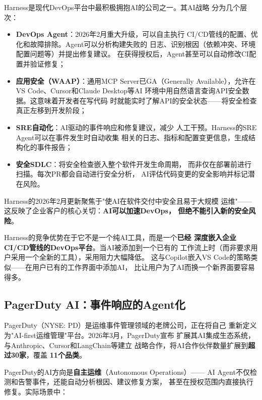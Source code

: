 Harness是现代DevOps平台中最积极拥抱AI的公司之一。其AI战略
分为几个层次：

\begin{itemize}
  \item \textbf{DevOps Agent}：2026年2月重大升级，可以自主执行
    CI/CD管线的配置、优化和故障排除。Agent可以分析构建失败的
    日志、识别根因（依赖冲突、环境配置问题等）并提出修复建议。
    在获得授权后，Agent甚至可以自动修改CI配置并验证修复；
  \item \textbf{应用安全（WAAP）}：通用MCP Server已GA（Generally
    Available），允许在VS Code、Cursor和Claude Desktop等AI
    环境中用自然语言查询API安全数据。这意味着开发者在写代码
    时就能实时了解API的安全状态——将安全检查真正左移到开发阶段；
  \item \textbf{SRE自动化}：AI驱动的事件响应和修复建议，减少
    人工干预。Harness的SRE Agent可以在事件发生时自动收集
    相关的日志、指标和配置变更信息，生成结构化的事件报告；
  \item \textbf{安全SDLC}：将安全检查嵌入整个软件开发生命周期，
    而非仅在部署前进行扫描。每次PR都会自动进行安全分析，
    AI评估代码变更的安全影响并标记潜在风险。
\end{itemize}

Harness的2026年2月更新聚焦于"使AI在软件交付中安全且易于大规模
运维"——这反映了企业客户的核心关切：\textbf{AI可以加速DevOps，
但绝不能引入新的安全风险}。

Harness的竞争优势在于它不是一个纯AI工具，而是一个\textbf{已经
深度嵌入企业CI/CD管线的DevOps平台}。当AI被添加到一个已有的
工作流上时（而非要求用户采用一个全新的工具），采用阻力大幅降低。
这与Copilot嵌入VS Code的策略类似——在用户已有的工作界面中添加AI，
比让用户为了AI而换一个新界面要容易得多。

\subsection{PagerDuty AI：事件响应的Agent化}
\label{subsec:pagerduty}

PagerDuty（NYSE: PD）是运维事件管理领域的老牌公司，正在将自己
重新定义为"AI-first运维管理"平台。2026年3月，PagerDuty宣布
扩展其AI集成生态系统，与Anthropic、Cursor和LangChain等建立
战略合作，将AI合作伙伴数量扩展到\textbf{超过30家}，覆盖
\textbf{11个品类}。

PagerDuty的AI方向是\textbf{自主运维}（Autonomous Operations）——
AI Agent不仅检测和告警事件，还能自动分析根因、建议修复方案，
甚至在授权范围内直接执行修复。实际场景中：


